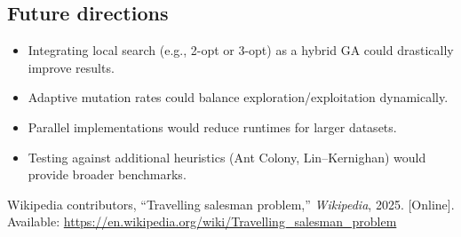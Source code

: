 \documentclass[conference]{IEEEtran}
\begin{document}
\subsection{Future directions}
\begin{itemize}
    \item Integrating local search (e.g., 2-opt or 3-opt) as a hybrid GA could drastically improve results.
    \item Adaptive mutation rates could balance exploration/exploitation dynamically.
    \item Parallel implementations would reduce runtimes for larger datasets.
    \item Testing against additional heuristics (Ant Colony, Lin–Kernighan) would provide broader benchmarks.
\end{itemize}



\begin{thebibliography}{1}
 Wikipedia contributors, ``Travelling salesman problem,'' \emph{Wikipedia}, 2025. [Online]. Available: \url{https://en.wikipedia.org/wiki/Travelling_salesman_problem}
\end{thebibliography}
\end{document}
